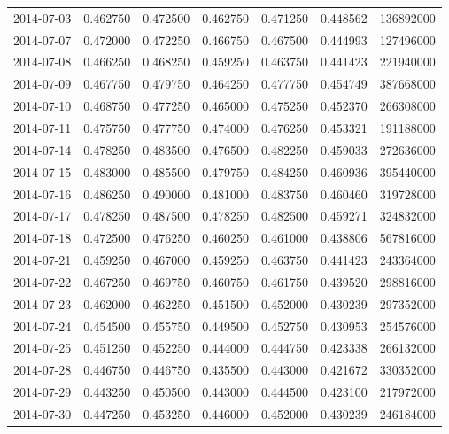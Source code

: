 \begin{tabular}{lrrrrrr}
2014-07-03 &    0.462750 &    0.472500 &    0.462750 &    0.471250 &    0.448562 &   136892000 \\
2014-07-07 &    0.472000 &    0.472250 &    0.466750 &    0.467500 &    0.444993 &   127496000 \\
2014-07-08 &    0.466250 &    0.468250 &    0.459250 &    0.463750 &    0.441423 &   221940000 \\
2014-07-09 &    0.467750 &    0.479750 &    0.464250 &    0.477750 &    0.454749 &   387668000 \\
2014-07-10 &    0.468750 &    0.477250 &    0.465000 &    0.475250 &    0.452370 &   266308000 \\
2014-07-11 &    0.475750 &    0.477750 &    0.474000 &    0.476250 &    0.453321 &   191188000 \\
2014-07-14 &    0.478250 &    0.483500 &    0.476500 &    0.482250 &    0.459033 &   272636000 \\
2014-07-15 &    0.483000 &    0.485500 &    0.479750 &    0.484250 &    0.460936 &   395440000 \\
2014-07-16 &    0.486250 &    0.490000 &    0.481000 &    0.483750 &    0.460460 &   319728000 \\
2014-07-17 &    0.478250 &    0.487500 &    0.478250 &    0.482500 &    0.459271 &   324832000 \\
2014-07-18 &    0.472500 &    0.476250 &    0.460250 &    0.461000 &    0.438806 &   567816000 \\
2014-07-21 &    0.459250 &    0.467000 &    0.459250 &    0.463750 &    0.441423 &   243364000 \\
2014-07-22 &    0.467250 &    0.469750 &    0.460750 &    0.461750 &    0.439520 &   298816000 \\
2014-07-23 &    0.462000 &    0.462250 &    0.451500 &    0.452000 &    0.430239 &   297352000 \\
2014-07-24 &    0.454500 &    0.455750 &    0.449500 &    0.452750 &    0.430953 &   254576000 \\
2014-07-25 &    0.451250 &    0.452250 &    0.444000 &    0.444750 &    0.423338 &   266132000 \\
2014-07-28 &    0.446750 &    0.446750 &    0.435500 &    0.443000 &    0.421672 &   330352000 \\
2014-07-29 &    0.443250 &    0.450500 &    0.443000 &    0.444500 &    0.423100 &   217972000 \\
2014-07-30 &    0.447250 &    0.453250 &    0.446000 &    0.452000 &    0.430239 &   246184000 \\

\end{tabular}
